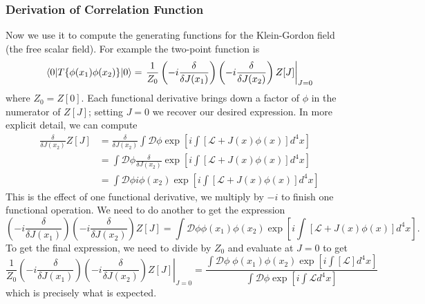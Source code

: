 \subsubsection{Derivation of Correlation Function}
Now we use it to compute the generating functions for the
Klein-Gordon field (the free scalar field). For example the
two-point function is
\begin{equation}%
\<0|T\{\phi(x_1)\phi(x_2)\}|0\> = \left.\frac{1}{Z_0}
\left(-i\frac{\delta}{\delta J(x_{1})}\right)
\left(-i\frac{\delta}{\delta J(x_{2})}\right)
Z[J]\right|_{J=0}
\end{equation}
where $Z_0=Z[0]$. Each functional derivative brings down a factor
of $\phi$ in the numerator of $Z[J]$; setting $J=0$ we recover
our desired expression. In more explicit detail, we can compute
\begin{subequations}
\begin{align}
\frac{\delta}{\delta J(x_2)}Z[J] &= \frac{\delta}{\delta J(x_2)}
\int\mathcal{D}\phi\exp\left[
i\int[\mathcal{L}+J(x)\phi(x)]d^{4}x
\right] \\
&= \int\mathcal{D}\phi\frac{\delta}{\delta J(x_2)}
\exp\left[
i\int[\mathcal{L}+J(x)\phi(x)]d^{4}x
\right] \\
&= \int\mathcal{D}\phi i\phi(x_2)
\exp\left[
i\int[\mathcal{L}+J(x)\phi(x)]d^{4}x
\right]
\end{align}
\end{subequations}
This is the effect of one functional derivative, we multiply by
$-i$ to finish one functional operation. We need to do another to
get the expression
\begin{equation}%
\left(-i\frac{\delta}{\delta J(x_{1})}\right)
\left(-i\frac{\delta}{\delta J(x_{2})}\right)
Z[J]
= \int\mathcal{D}\phi \phi(x_1)\phi(x_2)
\exp\left[
i\int[\mathcal{L}+J(x)\phi(x)]d^{4}x
\right].
\end{equation}
To get the final expression, we need to divide by $Z_0$ and
evaluate at $J=0$ to get
\begin{equation*}%
\left.\frac{1}{Z_0}
\left(-i\frac{\delta}{\delta J(x_{1})}\right)
\left(-i\frac{\delta}{\delta J(x_{2})}\right)
Z[J]\right|_{J=0} =\displaystyle{
\frac{\displaystyle\int\mathcal{D}\phi\; \phi(x_1)\phi(x_2)\exp\left[i\int[\mathcal{L}]d^{4}x\right]}
{\displaystyle\int\mathcal{D}\phi\exp\left[i\int\mathcal{L}d^{4}x\right]}}
\end{equation*}
which is precisely what is expected.

